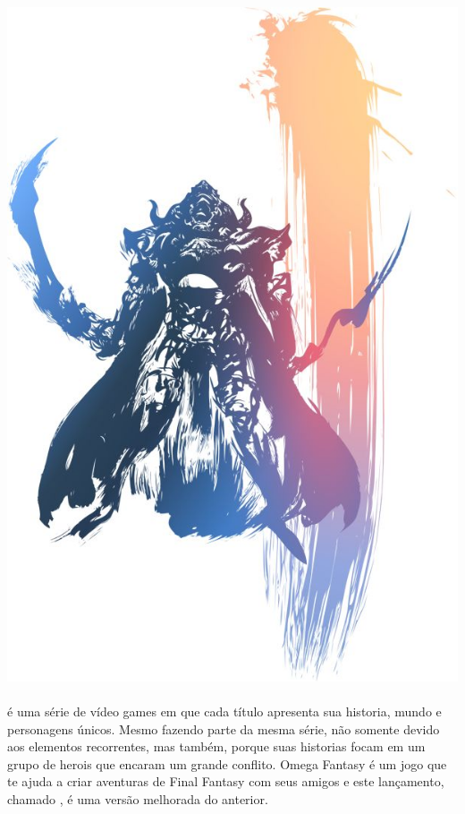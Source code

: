 %
\\\\
%
\includegraphics[width=\columnwidth]{./art/images/ff12.jpg} \\\\
%
 é uma série de vídeo games em que cada título apresenta sua historia, mundo e personagens únicos.
Mesmo fazendo parte da mesma série, não somente devido aos elementos recorrentes, mas também, porque suas historias focam em um grupo de herois que encaram um grande conflito.
Omega Fantasy é um jogo que te ajuda a criar aventuras de Final Fantasy com seus amigos e este lançamento, chamado , é uma versão melhorada do anterior. 

